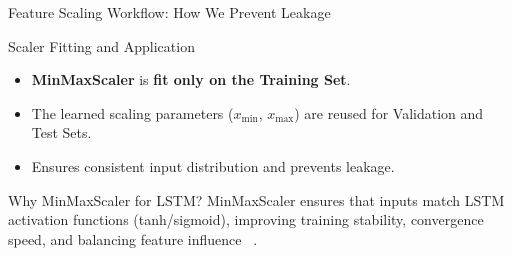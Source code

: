 \begin{frame}[label=featurescalingworkflow]{Feature Scaling Workflow: How We Prevent Leakage}

\small

\begin{block}{Scaler Fitting and Application}
\begin{itemize}
    \item \textbf{MinMaxScaler} is \textbf{fit only on the Training Set}.
    \item The learned scaling parameters ($x_{\min}$, $x_{\max}$) are reused for Validation and Test Sets.
    \item Ensures consistent input distribution and prevents leakage.
\end{itemize}
\end{block}

\begin{alertblock}{Why MinMaxScaler for LSTM?}
MinMaxScaler ensures that inputs match LSTM activation functions (tanh/sigmoid), improving training stability, convergence speed, and balancing feature influence
~\parencite{shaban2024SMPDL,phuoc2024StockPrediction}.
\end{alertblock}

\end{frame}

